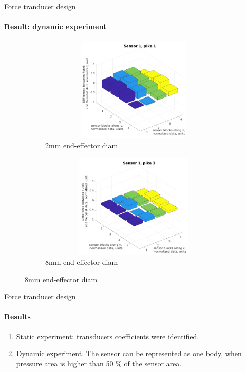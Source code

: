 \documentclass[aspectratio=169]{beamer}
\begin{document}
\begin{frame}[t]{Force tranducer design}
    \framesubtitle{Result: dynamic experiment}
    \vspace{-15pt}
    \begin{figure}[H]
        \begin{subfigure}{0.49\textwidth}
            \centering\includegraphics[height=5cm,width=1\textwidth,keepaspectratio]{sens1_pike1.png}
            \caption*{2mm end-effector diam}
            \label{fig:sens1_pike1}
        \end{subfigure}
        \begin{subfigure}{0.49\textwidth}
            \centering\includegraphics[height=5cm,width=1\textwidth,keepaspectratio]{sens1_pike3.png}
            \caption*{8mm end-effector diam}
            \label{fig:sens1_pike3}
        \end{subfigure}
    \end{figure}
\end{frame}

\begin{frame}[t]{Force tranducer design}
    \framesubtitle{Results}
    \vspace{-15pt}
    {\Large
        \begin{enumerate}
            \item Static experiment: transducers coefficients were identified.
            \item Dynamic experiment. The sensor can be represented as one body, when pressure area is higher than 50 \% of the sensor area.
        \end{enumerate}
    }
\end{frame}
\end{document}
